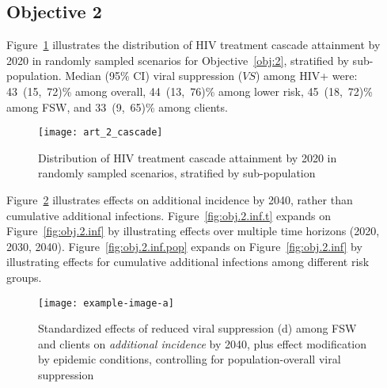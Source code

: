 \subsection{Objective 2}\label{a:res.2}
Figure~\ref{fig:obj.2.cascade} illustrates
the distribution of HIV treatment cascade attainment by 2020
in randomly sampled scenarios for Objective~\ref{obj:2}, stratified by sub-population.
Median (95\% CI) viral suppression ($VS$) among HIV+ were: %
43~(15,~72)\% among overall,
44~(13,~76)\% among lower risk,
45~(18,~72)\% among FSW, and
33~(9,~65)\% among clients.
\begin{figure}[h]
  \centerline{\texttt{[image: art\_2\_cascade]}}
  \caption{Distribution of HIV treatment cascade attainment by 2020
    in randomly sampled scenarios, stratified by sub-population}
  \label{fig:obj.2.cascade}
\end{figure}
\par
Figure~\ref{fig:obj.2.inc} illustrates effects on additional incidence by 2040,
rather than cumulative additional infections.
Figure~\ref{fig:obj.2.inf.t} expands on Figure~\ref{fig:obj.2.inf}
by illustrating effects over multiple time horizons (2020, 2030, 2040).
Figure~\ref{fig:obj.2.inf.pop} expands on Figure~\ref{fig:obj.2.inf}
by illustrating effects for cumulative additional infections among different risk groups.
\begin{figure}
  \texttt{[image: example-image-a]}%
  \caption{Standardized effects of reduced viral suppression (d) among FSW and clients
    on \emph{additional incidence} by 2040,
    plus effect modification by epidemic conditions,
    controlling for population-overall viral suppression}
  \label{fig:obj.2.inc}
\end{figure}

